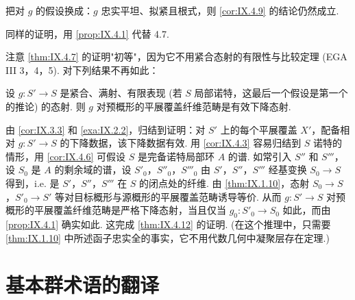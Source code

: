 \begin{corollary}\label{cor:IX.4.11}
把对 $g$ 的假设换成：$g$ 忠实平坦、拟紧且根式，则 \ref{cor:IX.4.9} 的结论仍然成立.
\end{corollary}

同样的证明，用 \ref{prop:IX.4.1} 代替 4.7.

注意 \ref{thm:IX.4.7} 的证明"初等"，因为它不用紧合态射的有限性与比较定理 (EGA III 3，4，5). 对下列结果不再如此：

\begin{theorem}\label{thm:IX.4.12}
设 $g \colon S' \to S$ 是紧合、满射、有限表现 (若 $S$ 局部诺特，这最后一个假设是第一个的推论) 的态射. 则 $g$ 对预概形的平展覆盖纤维范畴是有效下降态射.
\end{theorem}

由 \ref{cor:IX.3.3} 和 \ref{exa:IX.2.2}，归结到证明：对 $S'$ 上的每个平展覆盖 $X'$，配备相对 $g \colon S' \to S$ 的下降数据，该下降数据有效. 用 \ref{cor:IX.4.3} 容易归结到 $S$ 诺特的情形，用 \ref{cor:IX.4.6} 可假设 $S$ 是完备诺特局部环 $A$ 的谱. 如常引入 $S''$ 和 $S'''$，设 $S_0$ 是 $A$ 的剩余域的谱，设 $S'_0$，$S''_0$，$S'''_0$ 由 $S'$，$S''$，$S'''$ 经基变换 $S_0 \to S$ 得到，i.e. 是 $S'$，$S''$，$S'''$ 在 $S$ 的闭点处的纤维. 由 \ref{thm:IX.1.10}，态射 $S_0 \to S$，$S'_0 \to S'$ 等对目标概形与源概形的平展覆盖范畴诱导等价. 从而 $g \colon S' \to S$ 对预概形的平展覆盖纤维范畴是严格下降态射，当且仅当 $g_0 \colon S'_0 \to S_0$ 如此，而由 \ref{prop:IX.4.1} 确实如此. 这完成 \ref{thm:IX.4.12} 的证明. (在这个推理中，只需要 \ref{thm:IX.1.10} 中所述函子忠实全的事实，它不用代数几何中凝聚层存在定理.)

\section{基本群术语的翻译}

